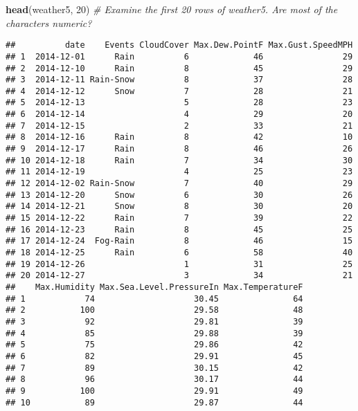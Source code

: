 \documentclass[]{article}
\newenvironment{Shaded}{\begin{snugshade}}{\end{snugshade}}
\newcommand{\KeywordTok}[1]{\textcolor[rgb]{0.13,0.29,0.53}{\textbf{#1}}}
\newcommand{\DecValTok}[1]{\textcolor[rgb]{0.00,0.00,0.81}{#1}}
\newcommand{\CommentTok}[1]{\textcolor[rgb]{0.56,0.35,0.01}{\textit{#1}}}
\newcommand{\NormalTok}[1]{#1}
\begin{document}
\begin{Shaded}
\begin{Highlighting}[]
\KeywordTok{head}\NormalTok{(weather5, }\DecValTok{20}\NormalTok{) }\CommentTok{# Examine the first 20 rows of weather5. Are most of the characters numeric?}
\end{Highlighting}
\end{Shaded}

\begin{verbatim}
##          date    Events CloudCover Max.Dew.PointF Max.Gust.SpeedMPH
## 1  2014-12-01      Rain          6             46                29
## 2  2014-12-10      Rain          8             45                29
## 3  2014-12-11 Rain-Snow          8             37                28
## 4  2014-12-12      Snow          7             28                21
## 5  2014-12-13                    5             28                23
## 6  2014-12-14                    4             29                20
## 7  2014-12-15                    2             33                21
## 8  2014-12-16      Rain          8             42                10
## 9  2014-12-17      Rain          8             46                26
## 10 2014-12-18      Rain          7             34                30
## 11 2014-12-19                    4             25                23
## 12 2014-12-02 Rain-Snow          7             40                29
## 13 2014-12-20      Snow          6             30                26
## 14 2014-12-21      Snow          8             30                20
## 15 2014-12-22      Rain          7             39                22
## 16 2014-12-23      Rain          8             45                25
## 17 2014-12-24  Fog-Rain          8             46                15
## 18 2014-12-25      Rain          6             58                40
## 19 2014-12-26                    1             31                25
## 20 2014-12-27                    3             34                21
##    Max.Humidity Max.Sea.Level.PressureIn Max.TemperatureF
## 1            74                    30.45               64
## 2           100                    29.58               48
## 3            92                    29.81               39
## 4            85                    29.88               39
## 5            75                    29.86               42
## 6            82                    29.91               45
## 7            89                    30.15               42
## 8            96                    30.17               44
## 9           100                    29.91               49
## 10           89                    29.87               44

\end{verbatim}
\end{document}
